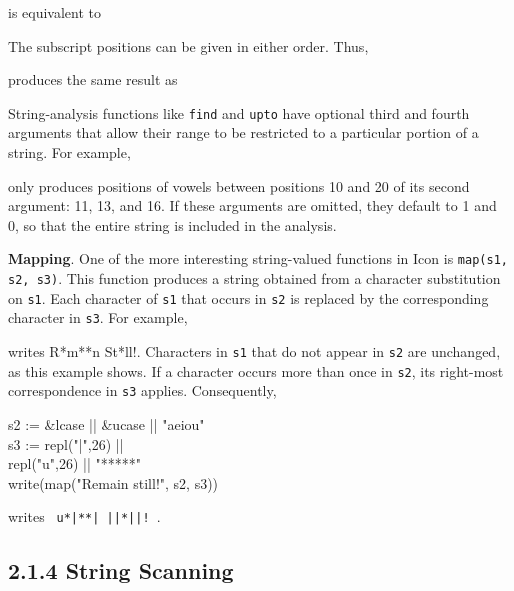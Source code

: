 
\noindent is equivalent to


The subscript positions can be given in either order. Thus,


\noindent produces the same result as


String-analysis functions like \texttt{find} and \texttt{upto} have
optional third and fourth arguments that allow their range to be
restricted to a particular portion of a string. For example,


\noindent only produces positions of vowels between positions 10 and
20 of its second argument: 11, 13, and 16. If these arguments are
omitted, they default to 1 and 0, so that the entire string is
included in the analysis.


\textbf{Mapping}. One of the more interesting string-valued functions
in Icon is \texttt{map(s1, s2, s3)}. This function produces a string
obtained from a character substitution on \texttt{s1}. Each character
of \texttt{s1} that occurs in \texttt{s2} is replaced by the
corresponding character in \texttt{s3}. For example,


\noindent writes R*m**n St*ll!. Characters in \texttt{s1} that do not
appear in \texttt{s2} are unchanged, as this example shows. If a
character occurs more than once in \texttt{s2}, its right-most
correspondence in \texttt{s3} applies. Consequently,

\begin{iconcode}
\>s2 := \&lcase || \&ucase || "aeiou"\\
\>s3 := repl("|",26) ||\\
\>repl("u",26) || "*****"\\
\>write(map("Remain still!", s2, s3))
\end{iconcode}

\noindent
writes \verb+ u*|**| ||*||! +.


\subsection[2.1.4 String Scanning]{2.1.4 String Scanning}

